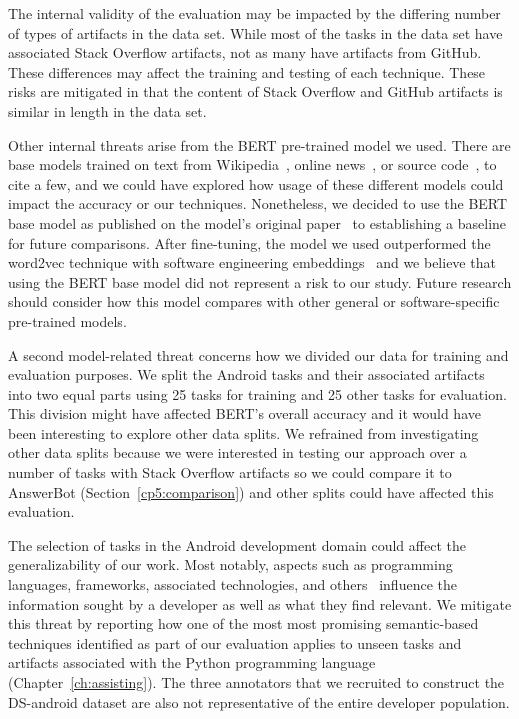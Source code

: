 The internal validity of the evaluation
may be impacted by the differing number of
types of artifacts in the data set.
While most of the tasks in the data set have
associated 
 Stack Overflow artifacts, not as many have artifacts from GitHub.
These differences may affect the training
and testing of each technique. These
risks are mitigated in that 
 the content of Stack Overflow and GitHub artifacts is similar in length in the data set.



Other internal threats arise from the BERT pre-trained model we used. 
There are base models trained on text from Wikipedia~\cite{Devlin2018Bert},  online news~\cite{peters2018elmo}, 
or source code~\cite{feng2020-codebert}, to  cite a few,
and we could have explored how usage of these different models could impact the accuracy or our 
techniques. Nonetheless, we decided to use 
the BERT base model as published on the model's original paper~\cite{Devlin2018Bert}
to establishing a baseline for future comparisons. 
After fine-tuning, the model we used outperformed 
the word2vec technique with software engineering embeddings~\cite{Efstathiou2018}
and we believe that using the BERT base model did not represent a risk to our study.
Future research should consider how this model compares with other 
general or software-specific pre-trained models.



A second model-related threat concerns how we
divided our data for training and evaluation purposes. 
We split the Android tasks and their associated artifacts into two equal parts using 
25 tasks for training and 25 other tasks for evaluation.
This division might have affected BERT's overall accuracy and it would have been interesting 
to explore other data splits. 
We refrained from investigating other data splits 
because we were interested in testing our approach over 
a number of tasks with Stack Overflow artifacts
so we could compare it to AnswerBot (Section~\ref{cp5:comparison})
 and other splits 
could have affected this evaluation.





The selection of tasks in the Android development domain could 
affect the generalizability of our work. Most notably, 
aspects such as programming languages, frameworks, associated technologies, and others~\cite{baltes2019}
influence the information sought by a developer as well as what they find relevant.
We mitigate this threat by reporting how one of the most 
most promising semantic-based techniques identified as part of our evaluation applies 
to unseen tasks and artifacts associated with the Python programming language (Chapter~\ref{ch:assisting}). 
The three annotators that we recruited to construct the \acs{DS-android} dataset are also not representative 
of the entire developer population. 


